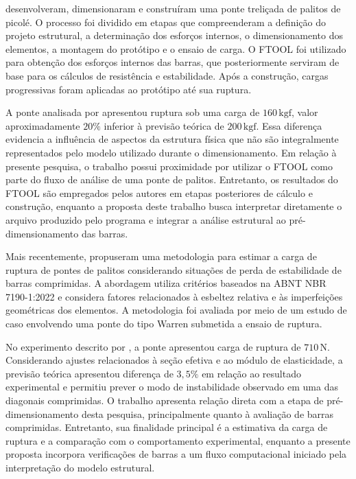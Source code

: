  desenvolveram, dimensionaram e construíram uma ponte treliçada de palitos de picolé. O processo foi dividido em etapas que compreenderam a definição do projeto estrutural, a determinação dos esforços internos, o dimensionamento dos elementos, a montagem do protótipo e o ensaio de carga. O \acrshort{FTOOL} foi utilizado para obtenção dos esforços internos das barras, que posteriormente serviram de base para os cálculos de resistência e estabilidade. Após a construção, cargas progressivas foram aplicadas ao protótipo até sua ruptura.

A ponte analisada por  apresentou ruptura sob uma carga de \(160\,\mathrm{kgf}\), valor aproximadamente \(20\%\) inferior à previsão teórica de \(200\,\mathrm{kgf}\). Essa diferença evidencia a influência de aspectos da estrutura física que não são integralmente representados pelo modelo utilizado durante o dimensionamento. Em relação à presente pesquisa, o trabalho possui proximidade por utilizar o \acrshort{FTOOL} como parte do fluxo de análise de uma ponte de palitos. Entretanto, os resultados do \acrshort{FTOOL} são empregados pelos autores em etapas posteriores de cálculo e construção, enquanto a proposta deste trabalho busca interpretar diretamente o arquivo produzido pelo programa e integrar a análise estrutural ao pré-dimensionamento das barras.

Mais recentemente,  propuseram uma metodologia para estimar a carga de ruptura de pontes de palitos considerando situações de perda de estabilidade de barras comprimidas. A abordagem utiliza critérios baseados na \acrshort{ABNT} \acrshort{NBR} 7190-1:2022 e considera fatores relacionados à esbeltez relativa e às imperfeições geométricas dos elementos. A metodologia foi avaliada por meio de um estudo de caso envolvendo uma ponte do tipo Warren submetida a ensaio de ruptura.

No experimento descrito por , a ponte apresentou carga de ruptura de \(710\,\mathrm{N}\). Considerando ajustes relacionados à seção efetiva e ao módulo de elasticidade, a previsão teórica apresentou diferença de \(3,5\%\) em relação ao resultado experimental e permitiu prever o modo de instabilidade observado em uma das diagonais comprimidas. O trabalho apresenta relação direta com a etapa de pré-dimensionamento desta pesquisa, principalmente quanto à avaliação de barras comprimidas. Entretanto, sua finalidade principal é a estimativa da carga de ruptura e a comparação com o comportamento experimental, enquanto a presente proposta incorpora verificações de barras a um fluxo computacional iniciado pela interpretação do modelo estrutural.

